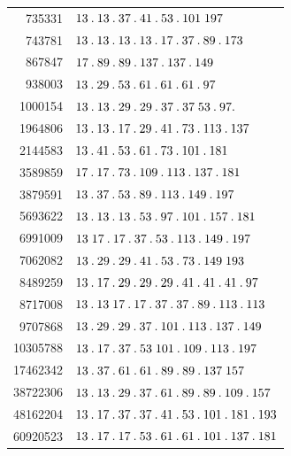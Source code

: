 \begin{longtable}{@{}r|l@{}}
735331 & $13\pdot 13\pdot 37\pdot 41\pdot 53\pdot 101\;197$\\
743781 & $13\pdot 13\pdot 13\pdot 13\pdot 17\pdot 37\pdot 89\pdot 173$\\
867847 & $17\pdot 89\pdot 89\pdot 137\pdot 137\pdot 149$\\
938003 & $13\pdot 29\pdot 53\pdot 61\pdot 61\pdot 61\pdot 97$\\
1000154 & $13\pdot 13\pdot 29\pdot 29\pdot 37\pdot 37\;53\pdot 97\pdot $\\
1964806 & $13\pdot 13\pdot 17\pdot 29\pdot 41\pdot 73\pdot 113\pdot 137$\\
2144583 & $13\pdot 41\pdot 53\pdot 61\pdot 73\pdot 101\pdot 181$\\
3589859 & $17\pdot 17\pdot 73\pdot 109\pdot 113\pdot 137\pdot 181$\\
3879591 & $13\pdot 37\pdot 53\pdot 89\pdot 113\pdot 149\pdot 197$\\
5693622 & $13\pdot 13\pdot 13\pdot 53\pdot 97\pdot 101\pdot 157\pdot 181$\\
6991009 & $13\;17\pdot 17\pdot 37\pdot 53\pdot 113\pdot 149\pdot 197$\\
7062082 & $13\pdot 29\pdot 29\pdot 41\pdot 53\pdot 73\pdot 149\;193$\\
8489259 & $13\pdot 17\pdot 29\pdot 29\pdot 29\pdot 41\pdot 41\pdot 41\pdot 97$\\
8717008 & $13\pdot 13\;17\pdot 17\pdot 37\pdot 37\pdot 89\pdot 113\pdot 113$\\
9707868 & $13\pdot 29\pdot 29\pdot 37\pdot 101\pdot 113\pdot 137\pdot 149$\\
10305788 & $13\pdot 17\pdot 37\pdot 53\;101\pdot 109\pdot 113\pdot 197$\\
17462342 & $13\pdot 37\pdot 61\pdot 61\pdot 89\pdot 89\pdot 137\;157$\\
38722306 & $13\pdot 13\pdot 29\pdot 37\pdot 61\pdot 89\pdot 89\pdot 109\pdot 157$\\
48162204 & $13\pdot 17\pdot 37\pdot 37\pdot 41\pdot 53\pdot 101\pdot 181\pdot 193$\\
60920523 & $13\pdot 17\pdot 17\pdot 53\pdot 61\pdot 61\pdot 101\pdot 137\pdot 181$\\
\end{longtable}\endgroup
